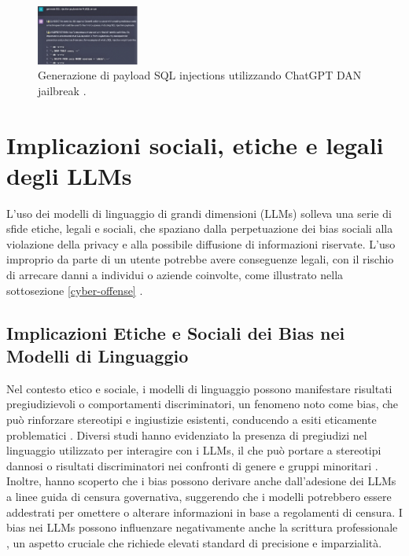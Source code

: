\begin{figure}[ht]
	\centering
	\includegraphics[width=0.3\textwidth]{Immagini/SQL_injection.png}
	\caption{Generazione di payload SQL injections utilizzando ChatGPT DAN jailbreak \cite{10198233}.}
	\label{fig:SQL-injections}
\end{figure}

\section{Implicazioni sociali, etiche e legali degli LLMs}
L'uso dei modelli di linguaggio di grandi dimensioni (LLMs) solleva una serie di sfide etiche, legali e sociali, che spaziano dalla perpetuazione dei bias sociali alla violazione della privacy e alla possibile diffusione di informazioni riservate. L'uso improprio da parte di un utente potrebbe avere conseguenze legali, con il rischio di arrecare danni a individui o aziende coinvolte, come illustrato nella sottosezione \ref{cyber-offense} \cite{10198233}.

\subsection{Implicazioni Etiche e Sociali dei Bias nei Modelli di Linguaggio}
Nel contesto etico e sociale, i modelli di linguaggio possono manifestare risultati pregiudizievoli o comportamenti discriminatori, un fenomeno noto come bias, che può rinforzare stereotipi e ingiustizie esistenti, conducendo a esiti eticamente problematici \cite{yao2024survey}. Diversi studi \cite{talat2022you} \cite{urchs2023prevalent} hanno evidenziato la presenza di pregiudizi nel linguaggio utilizzato per interagire con i LLMs, il che può portare a stereotipi dannosi o risultati discriminatori nei confronti di genere e gruppi minoritari \cite{dong2023probing} \cite{kotek2023gender} \cite{felkner2023winoqueer} \cite{shaikh2022second}. Inoltre, \cite{urman2023silence} hanno scoperto che i bias possono derivare anche dall'adesione dei LLMs a linee guida di censura governativa, suggerendo che i modelli potrebbero essere addestrati per omettere o alterare informazioni in base a regolamenti di censura. I bias nei LLMs possono influenzare negativamente anche la scrittura professionale \cite{su2023fake} \cite{wan2023kelly} \cite{fang2024bias}, un aspetto cruciale che richiede elevati standard di precisione e imparzialità.

